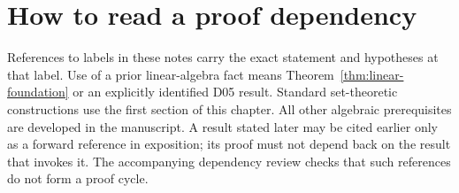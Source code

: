 \section{How to read a proof dependency}
References to labels in these notes carry the exact statement and
hypotheses at that label. Use of a prior linear-algebra fact means
Theorem~\ref{thm:linear-foundation} or an explicitly identified D05
result. Standard set-theoretic constructions use the first section of
this chapter. All other algebraic prerequisites are developed in the
manuscript. A result stated later may be cited earlier only as a
forward reference in exposition; its proof must not depend back on the
result that invokes it. The accompanying dependency review checks that
such references do not form a proof cycle.
